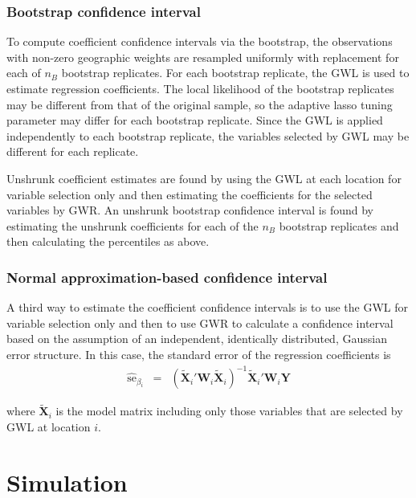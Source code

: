 \documentclass[authoryear, review, 11pt]{elsarticle}
\begin{document}
	 	\subsubsection{Bootstrap confidence interval}
		To compute coefficient confidence intervals via the bootstrap, the observations with non-zero geographic weights are resampled uniformly with replacement for each of $n_B$ bootstrap replicates. For each bootstrap replicate, the GWL is used to estimate regression coefficients. The local likelihood of the bootstrap replicates may be different from that of the original sample, so the adaptive lasso tuning parameter may differ for each bootstrap replicate. Since the GWL is applied independently to each bootstrap replicate, the variables selected by GWL may be different for each replicate.
	
		 Unshrunk coefficient estimates are found by using the GWL at each location for variable selection only and then estimating the coefficients for the selected variables by GWR. An unshrunk bootstrap confidence interval is found by estimating the unshrunk coefficients for each of the $n_B$ bootstrap replicates and then calculating the percentiles as above.\\
	 
		
	 	\subsubsection{Normal approximation-based confidence interval}
		A third way to estimate the coefficient confidence intervals is to use the GWL for variable selection only and then to use GWR to calculate a confidence interval based on the assumption of an independent, identically distributed, Gaussian error structure. In this case, the standard error of the regression coefficients is 
		\begin{eqnarray}
			\hat{\mbox{se}}_{\beta_i} &=& \left( \tilde{\bm{X}}_i'\bm{W}_i \tilde{\bm{X}}_i \right)^{-1}  \tilde{\bm{X}}_i'\bm{W}_i\bm{Y}
		\end{eqnarray}
	
		where $\tilde{\bm{X}}_i$ is the model matrix including only those variables that are selected by GWL at location $i$.



\section{Simulation}
\end{document}
